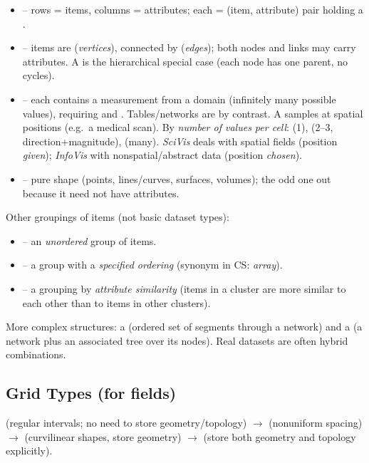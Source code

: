 \begin{itemize}
  \item {} -- rows = items, columns = attributes; each  = (item, attribute) pair holding a .
  \item {} -- items are  (\emph{vertices}), connected by  (\emph{edges}); both nodes and links may carry attributes. A  is the hierarchical special case (each node has one parent, no cycles).
  \item {} -- each  contains a measurement from a  domain (infinitely many possible values), requiring  and . Tables/networks are  by contrast. A  samples at spatial positions (e.g.\ a medical scan). By \emph{number of values per cell}:  (1),  (2--3, direction+magnitude),  (many). \emph{SciVis} deals with spatial fields (position \emph{given}); \emph{InfoVis} with nonspatial/abstract data (position \emph{chosen}).
  \item {} -- pure shape (points, lines/curves, surfaces, volumes); the odd one out because it need not have attributes.
\end{itemize}

Other groupings of items (not basic dataset types):
\begin{itemize}
  \item {} -- an \emph{unordered} group of items.
  \item {} -- a group with a \emph{specified ordering} (synonym in CS: \emph{array}).
  \item {} -- a grouping by \emph{attribute similarity} (items in a cluster are more similar to each other than to items in other clusters).
\end{itemize}
More complex structures: a  (ordered set of segments through a network) and a  (a network plus an associated tree over its nodes). Real datasets are often hybrid combinations.

\subsection{Grid Types (for fields)}
 (regular intervals; no need to store geometry/topology) $\rightarrow$
 (nonuniform spacing) $\rightarrow$  (curvilinear
shapes, store geometry) $\rightarrow$  (store both geometry and
topology explicitly).

